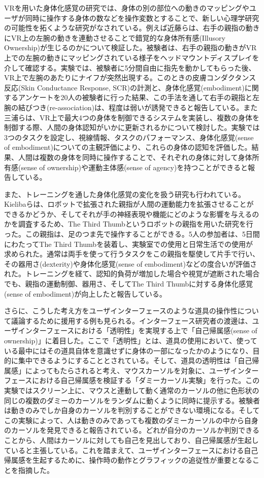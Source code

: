 VRを用いた身体化感覚の研究では、身体の別の部位への動きのマッピングやユーザが同時に操作する身体の数などを操作変数とすることで、新しい心理学研究の可能性を拓くような研究がなされている。例えば近藤ら\cite{Kondo2020}は、右手の親指の動きにVR上の左腕の動きを連動させることで錯覚的な身体所有感(Illusory Ownership)が生じるのかについて検証した。被験者は、右手の親指の動きがVR上での左腕の動きにマッピングされている様子をヘッドマウントディスプレイを介して確認する。実験では、被験者に5分間自由に指先を動かしてもらった後、VR上で左腕のあたりにナイフが突然出現する。このときの皮膚コンダクタンス反応(Skin Conductance Response, SCR)の計測と、身体化感覚(embodiment)に関するアンケートを20人の被験者に行った結果、この手法を通して右手の親指と左腕の結びつき(re-association)は、程度は弱いが誘発できると報告している。また三浦ら\cite{miura2022multisoma}は、VR上で最大4つの身体を制御できるシステムを実装し、複数の身体を制御する際、人間の身体認知がいかに更新されるかについて検討した。実験では3つのタスクを設定し、視線情報、タスクのパフォーマンス、身体化感覚(sense of embodiment)についての主観評価により、これらの身体の認知を評価した。結果、人間は複数の身体を同時に操作することで、それぞれの身体に対して身体所有感(sense of ownership)や運動主体感(sense of agency)を持つことができると報告している。

また、トレーニングを通した身体化感覚の変化を扱う研究も行われている。Kielibaら\cite{kieliba2021robotic}は、ロボットで拡張された親指が人間の運動能力を拡張させることができるかどうか、そしてそれが手の神経表現や機能にどのような影響を与えるのかを調査するため、The Third Thumbというロボットの親指を用いた研究を行った。この親指は、足のつま先で操作することができる。5人の参加者は、5日間にわたってThe Third Thumbを装着し、実験室での使用と日常生活での使用が求められた。通常は両手を使って行うタスクをこの親指を駆使して片手で行い、その器用さ(dexterity)や身体化感覚(sense of embodiment)などの度合いが評価された。トレーニングを経て、認知的負荷が増加した場合や視覚が遮断された場合でも、親指の運動制御、器用さ、そしてThe Third Thumbに対する身体化感覚(sense of embodiment)が向上したと報告している。

さらに、こうした考え方をユーザインターフェースのような道具の操作性について議論するために援用する例も見られる。インターフェース研究者の渡邊は、ユーザインターフェースにおける「透明性」を実現する上で「自己帰属感(sense of ownership)」に着目した\cite{Watanabe2017}。ここで「透明性」とは、道具の使用において、使っている最中にはその道具自体を意識せずに身体の一部になったかのようになり、目的に集中できるようにすることとされている。そして、道具の透明性は「自己帰属感」によってもたらされると考え、マウスカーソルを対象に、ユーザインターフェースにおける自己帰属感を検証する「ダミーカーソル実験」を行った\cite{Watanabe2013}。この実験ではスクリーン上に、マウスと連動して動く通常のカーソルの他に色形状の同じの複数のダミーのカーソルをランダムに動くように同時に提示する。被験者は動きのみでしか自身のカーソルを判別することができない環境になる。そしてこの実験によって、人は動きのみであっても複数のダミーカーソルの中から自身のカーソルを発見できると報告されている。どれが自分のカーソルか判別できることから、人間はカーソルに対しても自己を見出しており、自己帰属感が生起していると主張している。これを踏まえて、ユーザインターフェースにおける自己帰属感を生起するために、操作時の動作とグラフィックの追従性が重要となることを指摘した。

